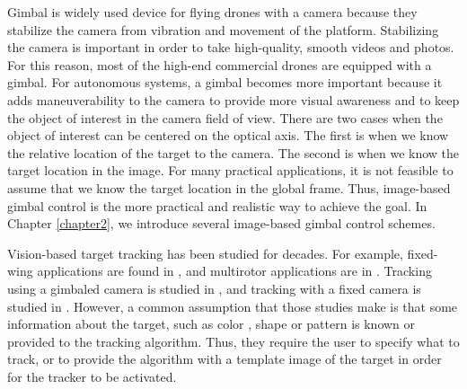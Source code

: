 Gimbal is widely used device for flying drones with a camera because they stabilize the camera from vibration and movement of the platform. Stabilizing the camera is important in order to take high-quality, smooth videos and photos. For this reason, most of the high-end commercial drones are equipped with a gimbal. For autonomous systems, a gimbal becomes more important because it adds maneuverability to the camera to provide more visual awareness and to keep the object of interest in the camera field of view. There are two cases when the object of interest can be centered on the optical axis. The first is when we know the relative location of the target to the camera. The second is when we know the target location in the image. For many practical applications, it is not feasible to assume that we know the target location in the global frame. Thus, image-based gimbal control is the more practical and realistic way to achieve the goal. In Chapter \ref{chapter2}, we introduce several image-based gimbal control schemes.

Vision-based target tracking has been studied for decades. For example, fixed-wing applications are found in \cite{Saunders2011, Rysdyk2006, Dobrokhodov2006, Qadir2011, Theodorakopoulos2008}, and multirotor applications are in \cite{Pestana2013, Thomas2017, Teuliere2011, Kim2013}. Tracking using a gimbaled camera is studied in \cite{Rysdyk2006, Dobrokhodov2006, Hurak2012}, and tracking with a fixed camera is studied in \cite{Saunders2011, Theodorakopoulos2008, Pestana2013, Thomas2017, Teuliere2011, Kim2013}. However, a common assumption that those studies make is that some information about the target, such as color \cite{Teuliere2011, Kim2013}, shape \cite{Thomas2017} or pattern \cite{Lee2012} is known or provided to the tracking algorithm. Thus, they require the user to specify what to track, or to provide the algorithm with a template image of the target in order for the tracker to be activated. 

